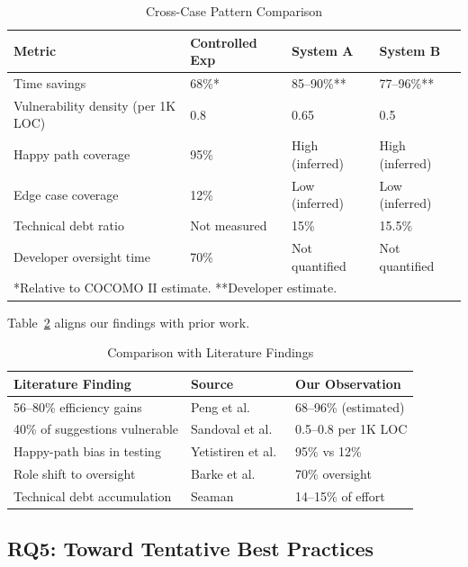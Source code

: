 \documentclass[sigconf]{acmart}
\begin{document}
\begin{table}[htbp]
\caption{Cross-Case Pattern Comparison}
\label{tab:cross-case}
\centering
\small
\begin{tabular}{@{}p{}p{}p{}p{}@{}}
\toprule
\textbf{Metric} & \textbf{Controlled Exp} & \textbf{System A} & \textbf{System B} \\
\midrule
Time savings & 68\%* & 85–90\%** & 77–96\%** \\
Vulnerability density (per 1K LOC) & 0.8 & 0.65 & 0.5 \\
Happy path coverage & 95\% & High (inferred) & High (inferred) \\
Edge case coverage & 12\% & Low (inferred) & Low (inferred) \\
Technical debt ratio & Not measured & 15\% & 15.5\% \\
Developer oversight time & 70\% & Not quantified & Not quantified \\
\bottomrule
\multicolumn{4}{l}{*Relative to COCOMO II estimate. **Developer estimate.}
\end{tabular}
\end{table}

Table~\ref{tab:literature-comp} aligns our findings with prior work.

\begin{table}[htbp]
\caption{Comparison with Literature Findings}
\label{tab:literature-comp}
\centering
\small
\begin{tabular}{@{}p{}p{}p{}@{}}
\toprule
\textbf{Literature Finding} & \textbf{Source} & \textbf{Our Observation} \\
\midrule
56–80\% efficiency gains & Peng et al.~\cite{peng2023impact} & 68–96\% (estimated) \\
40\% of suggestions vulnerable & Sandoval et al.~\cite{sandoval2023lost} & 0.5–0.8 per 1K LOC \\
Happy-path bias in testing & Yetistiren et al.~\cite{yetistiren2023assessing} & 95\% vs 12\% \\
Role shift to oversight & Barke et al.~\cite{barke2023grounded} & 70\% oversight \\
Technical debt accumulation & Seaman~\cite{seaman2011measuring} & 14–15\% of effort \\
\bottomrule
\end{tabular}
\end{table}

\subsection{RQ5: Toward Tentative Best Practices}
\end{document}
